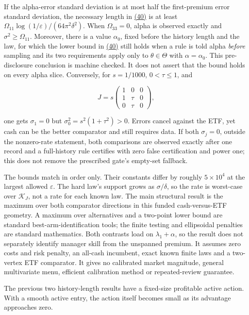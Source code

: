 \documentclass[11pt]{article}
\begin{document}
If the alpha-error standard deviation is at most half the
first-premium error standard deviation, the necessary length
in \hyperref[eq:40]{(40)} is at least
\(\Omega_{11}\log(1/\varepsilon)/(64\pi^2\delta^2)\).
When \(\Omega_{33}=0\), alpha is observed exactly and
\(\sigma^2\geq\Omega_{11}\). Moreover, there is a value
\(\alpha_0\), fixed before the history length and the law,
for which the lower bound in \hyperref[eq:40]{(40)} still holds when a rule is
told alpha \emph{before} sampling and its two requirements apply
only to \(\theta\in\Theta\) with \(\alpha=\alpha_0\).
This pre-disclosure conclusion is machine checked. It does
not assert that the bound holds on every alpha slice.
Conversely, for \(s=1/1000\), \(0<\tau\leq1\), and

\begin{equation*}
J=s\begin{pmatrix}1&0&0\\1&\tau&0\\0&\tau&0\end{pmatrix},
\end{equation*}

one gets \(\sigma_1=0\) but
\(\sigma_0^2=s^2(1+\tau^2)>0\). Errors cancel against
the ETF, yet cash can be the better comparator and still
requires data. If both \(\sigma_j=0\), outside the
nonzero-rate statement, both comparisons are observed
exactly after one record and a full-history rule certifies
with zero false certification and power one; this does not
remove the prescribed gate's empty-set fallback.

The bounds match in order only. Their constants differ by
roughly \(5\times10^4\) at the largest allowed
\(\varepsilon\). The hard law's support grows as
\(\sigma/\delta\), so the rate is worst-case over
\(\mathcal K_J\), not a rate for each known law. The main
structural result is the maximum over both comparator
directions in this funded cash-versus-ETF geometry. A maximum over
alternatives and a two-point lower bound are standard
best-arm-identification tools; the finite testing and ellipsoidal
penalties are standard mathematics. Both contrasts load on
\(\lambda_1+\alpha\), so the result does not separately
identify manager skill from the unspanned premium. It assumes
zero costs and risk penalty, an all-cash incumbent, exact
known finite laws and a two-vertex ETF comparator. It gives
no calibrated market magnitude, general multivariate menu,
efficient calibration method or repeated-review guarantee.

The previous two history-length results have a fixed-size
profitable active action. With a smooth active entry, the
action itself becomes small as its advantage approaches zero.
\end{document}
